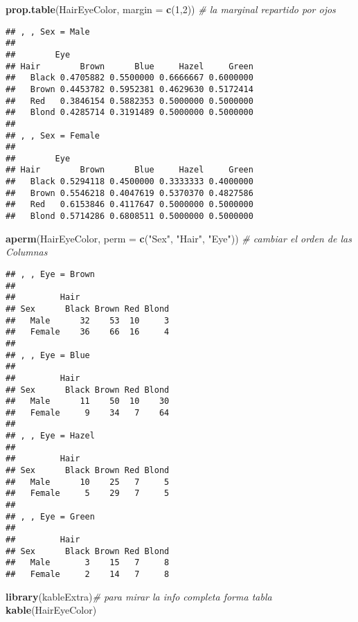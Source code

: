 \documentclass[]{article}
\newenvironment{Shaded}{\begin{snugshade}}{\end{snugshade}}
\newcommand{\CommentTok}[1]{\textcolor[rgb]{0.56,0.35,0.01}{\textit{#1}}}
\newcommand{\DataTypeTok}[1]{\textcolor[rgb]{0.13,0.29,0.53}{#1}}
\newcommand{\DecValTok}[1]{\textcolor[rgb]{0.00,0.00,0.81}{#1}}
\newcommand{\KeywordTok}[1]{\textcolor[rgb]{0.13,0.29,0.53}{\textbf{#1}}}
\newcommand{\NormalTok}[1]{#1}
\newcommand{\StringTok}[1]{\textcolor[rgb]{0.31,0.60,0.02}{#1}}
\begin{document}
\begin{Shaded}
\begin{Highlighting}[]
\KeywordTok{prop.table}\NormalTok{(HairEyeColor, }\DataTypeTok{margin =} \KeywordTok{c}\NormalTok{(}\DecValTok{1}\NormalTok{,}\DecValTok{2}\NormalTok{)) }\CommentTok{# la marginal repartido por ojos}
\end{Highlighting}
\end{Shaded}

\begin{verbatim}
## , , Sex = Male
## 
##        Eye
## Hair        Brown      Blue     Hazel     Green
##   Black 0.4705882 0.5500000 0.6666667 0.6000000
##   Brown 0.4453782 0.5952381 0.4629630 0.5172414
##   Red   0.3846154 0.5882353 0.5000000 0.5000000
##   Blond 0.4285714 0.3191489 0.5000000 0.5000000
## 
## , , Sex = Female
## 
##        Eye
## Hair        Brown      Blue     Hazel     Green
##   Black 0.5294118 0.4500000 0.3333333 0.4000000
##   Brown 0.5546218 0.4047619 0.5370370 0.4827586
##   Red   0.6153846 0.4117647 0.5000000 0.5000000
##   Blond 0.5714286 0.6808511 0.5000000 0.5000000
\end{verbatim}

\begin{Shaded}
\begin{Highlighting}[]
\KeywordTok{aperm}\NormalTok{(HairEyeColor, }\DataTypeTok{perm =} \KeywordTok{c}\NormalTok{(}\StringTok{"Sex"}\NormalTok{, }\StringTok{"Hair"}\NormalTok{, }\StringTok{"Eye"}\NormalTok{)) }\CommentTok{# cambiar el orden de las Columnas}
\end{Highlighting}
\end{Shaded}

\begin{verbatim}
## , , Eye = Brown
## 
##         Hair
## Sex      Black Brown Red Blond
##   Male      32    53  10     3
##   Female    36    66  16     4
## 
## , , Eye = Blue
## 
##         Hair
## Sex      Black Brown Red Blond
##   Male      11    50  10    30
##   Female     9    34   7    64
## 
## , , Eye = Hazel
## 
##         Hair
## Sex      Black Brown Red Blond
##   Male      10    25   7     5
##   Female     5    29   7     5
## 
## , , Eye = Green
## 
##         Hair
## Sex      Black Brown Red Blond
##   Male       3    15   7     8
##   Female     2    14   7     8
\end{verbatim}

\begin{Shaded}
\begin{Highlighting}[]
\KeywordTok{library}\NormalTok{(kableExtra)}\CommentTok{# para mirar la info completa forma tabla}
\KeywordTok{kable}\NormalTok{(HairEyeColor)}
\end{Highlighting}
\end{Shaded}
\end{document}
